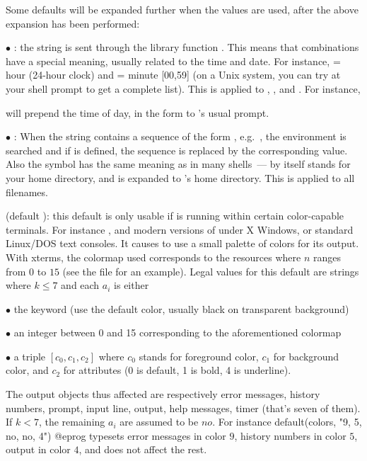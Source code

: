 Some defaults will be expanded further when the values are used, after the
above expansion has been performed:

$\bullet$ : the string is sent through the library
function . This means that \kbd{\%} combinations have
a special meaning, usually related to the time and date. For instance,
 = hour (24-hour clock) and  = minute [00,59] (on a Unix
system, you can try  at your shell prompt to get a complete
list). This is applied to , , and . For
instance,


\noindent
will prepend the time of day, in the form 
to 's usual prompt.

$\bullet$ : When the string contains a sequence of
the form , e.g.~, the environment is
searched and if  is defined, the sequence is replaced by the
corresponding value. Also the \kbd{\til} symbol has the same meaning as in
many shells~--- \kbd{\til} by itself stands for your home directory, and
 is expanded to 's home directory. This is applied
to all filenames. \label{se:envir}

 (default ): this default is only usable if
\label{se:colors}
is running within certain color-capable terminals. For instance ,
 and modern versions of  under X Windows, or
standard Linux/DOS text consoles. It causes  to use a small palette of
colors for its output. With xterms, the colormap used corresponds to the
resources  where $n$ ranges from $0$ to $15$ (see the
file  for an example). Legal values for this default are
strings  where $k\le7$ and each $a_i$ is either

\noindent $\bullet$ the keyword  (use the default color, usually
black on transparent background)

\noindent $\bullet$ an integer between 0 and 15 corresponding to the
aforementioned colormap

\noindent $\bullet$ a triple $[c_0,c_1,c_2]$ where $c_0$ stands for foreground
color, $c_1$ for background color, and $c_2$ for attributes (0 is default, 1
is bold, 4 is underline).

The output objects thus affected are respectively error messages,
history numbers, prompt, input line, output, help messages, timer (that's
seven of them). If $k < 7$, the remaining $a_i$ are assumed to be $no$. For
instance
%
\bprog
default(colors, "9, 5, no, no, 4")
@eprog
\noindent
typesets error messages in color $9$, history numbers in color $5$, output in
color $4$, and does not affect the rest.

